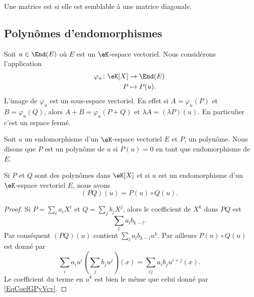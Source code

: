 \begin{definition}  \label{DefCNJqsmo}
    Une matrice est  si elle est semblable à une matrice diagonale.
\end{definition}

\subsection{Polynômes d'endomorphismes}

Soit \( u\in\End(E)\) où \( E\) est un \( \eK\)-espace vectoriel. Nous considérons l'application
\begin{equation}    \label{EqOVKooeMJuv}
    \begin{aligned}
        \varphi_u\colon \eK[X]&\to \End(E) \\
        P&\mapsto P(u). 
    \end{aligned}
\end{equation}
L'image de \( \varphi_u\) est un sous-espace vectoriel. En effet si \( A=\varphi_u(P)\) et \( B=\varphi_u(Q)\), alors \( A+B=\varphi_u(P+Q)\) et \( \lambda A=(\lambda P)(u)\). En particulier c'est un espace fermé.

Soit \( u\) un endomorphisme d'un \( \eK\)-espace vectoriel \( E\) et \( P\), un polynôme. Nous disons que \( P\) est un polynôme  de \( u\) si \( P(u)=0\) en tant que endomorphisme de \( E\).

\begin{lemma}       \label{LemQWvhYb}
    Si \( P\) et \( Q\) sont des polynômes dans \( \eK[X]\) et si \( u\) est un endomorphisme d'un \( \eK\)-espace vectoriel \( E\), nous avons
    \begin{equation}
        (PQ)(u)=P(u)\circ Q(u).
    \end{equation}
\end{lemma}

\begin{proof}
    Si \( P=\sum_i a_iX^i\) et \( Q=\sum_j b_jX^j\), alors le coefficient de \( X^k\) dans \( PQ\) est
    \begin{equation}        \label{EqCoefGPyVcv}
        \sum_la_lb_{k-l}.
    \end{equation}
    Par conséquent \( (PQ)(u)\) contient \( \sum_la_lb_{k-l}u^k\). Par ailleurs \( P(u)\circ Q(u)\) est donné par
    \begin{equation}
        \sum_ia_iu^i\left( \sum_jb_ju^j \right)(x)=\sum_{ij}a_ib_ju^{i+j}(x).
    \end{equation}
    Le coefficient du terme en \( u^k\) est bien le même que celui donné par \eqref{EqCoefGPyVcv}.
\end{proof}

